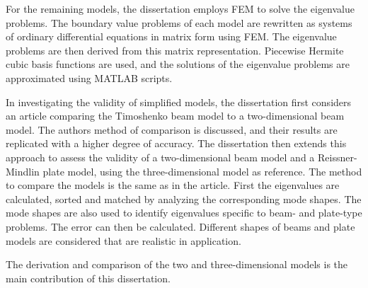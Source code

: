 \documentclass[main.tex]{subfiles}
\begin{document}
For the remaining models, the dissertation employs FEM to solve the eigenvalue problems. The boundary value problems of each model are rewritten as systems of ordinary differential equations in matrix form using FEM. The eigenvalue problems are then derived from this matrix representation. Piecewise Hermite cubic basis functions are used, and the solutions of the eigenvalue problems are approximated using MATLAB scripts.

In investigating the validity of simplified models, the dissertation first considers an article comparing the Timoshenko beam model to a two-dimensional beam model. The authors method of comparison is discussed, and their results are replicated with a higher degree of accuracy. The dissertation then extends this approach to assess the validity of a two-dimensional beam model and a Reissner-Mindlin plate model, using the three-dimensional model as reference. The method to compare the models is the same as in the article. First the eigenvalues are calculated, sorted and matched by analyzing the corresponding mode shapes. The mode shapes are also used to identify eigenvalues specific to beam- and plate-type problems. The error can then be calculated. Different shapes of beams and plate models are considered that are realistic in application. 

The derivation and comparison of the two and three-dimensional models is the main contribution of this dissertation.
\end{document}
